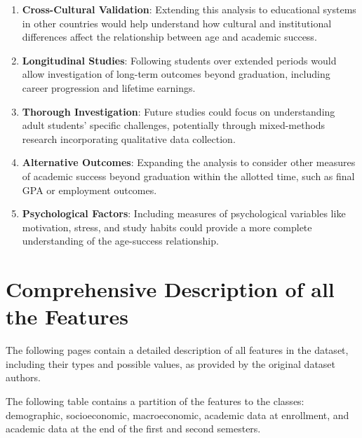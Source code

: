 \documentclass{article}
\begin{document}
\begin{enumerate}
    \item \textbf{Cross-Cultural Validation}: Extending this analysis to educational systems in other countries would help understand how cultural and institutional differences affect the relationship between age and academic success.

    \item \textbf{Longitudinal Studies}: Following students over extended periods would allow investigation of long-term outcomes beyond graduation, including career progression and lifetime earnings.

    \item \textbf{Thorough Investigation}: Future studies could focus on understanding adult students' specific challenges, potentially through mixed-methods research incorporating qualitative data collection.

    \item \textbf{Alternative Outcomes}: Expanding the analysis to consider other measures of academic success beyond graduation within the allotted time, such as final GPA or employment outcomes.
    
    \item \textbf{Psychological Factors}: Including measures of psychological variables like motivation, stress, and study habits could provide a more complete understanding of the age-success relationship.
\end{enumerate}




\appendix

\newpage
\section{Comprehensive Description of all the Features}\label{appendix:feature_description}

The following pages contain a detailed description of all features in the dataset, including their types and possible values, as provided by the original dataset authors.



The following table contains a partition of the features to the classes: demographic, socioeconomic, macroeconomic, academic data at enrollment, and academic data at the end of the first and second semesters.
\end{document}
